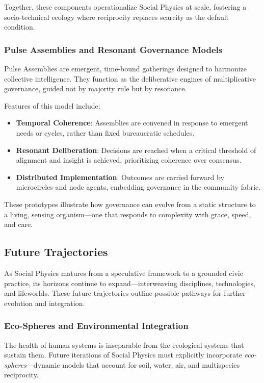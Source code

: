 \documentclass{article}
\theoremstyle{plain}
\theoremstyle{claimstyle}
\begin{document}
Together, these components operationalize Social Physics at scale, fostering a socio-technical ecology where reciprocity replaces scarcity as the default condition.

\subsubsection{Pulse Assemblies and Resonant Governance Models}

Pulse Assemblies are emergent, time-bound gatherings designed to harmonize collective intelligence. They function as the deliberative engines of multiplicative governance, guided not by majority rule but by resonance.

Features of this model include:

\begin{itemize}
    \item \textbf{Temporal Coherence}: Assemblies are convened in response to emergent needs or cycles, rather than fixed bureaucratic schedules.
    \item \textbf{Resonant Deliberation}: Decisions are reached when a critical threshold of alignment and insight is achieved, prioritizing coherence over consensus.
    \item \textbf{Distributed Implementation}: Outcomes are carried forward by microcircles and node agents, embedding governance in the community fabric.
\end{itemize}

These prototypes illustrate how governance can evolve from a static structure to a living, sensing organism—one that responds to complexity with grace, speed, and care.

\subsection{Future Trajectories}

As Social Physics matures from a speculative framework to a grounded civic practice, its horizons continue to expand—interweaving disciplines, technologies, and lifeworlds. These future trajectories outline possible pathways for further evolution and integration.

\subsubsection{Eco-Spheres and Environmental Integration}

The health of human systems is inseparable from the ecological systems that sustain them. Future iterations of Social Physics must explicitly incorporate \textit{eco-spheres}—dynamic models that account for soil, water, air, and multispecies reciprocity.
\end{document}
